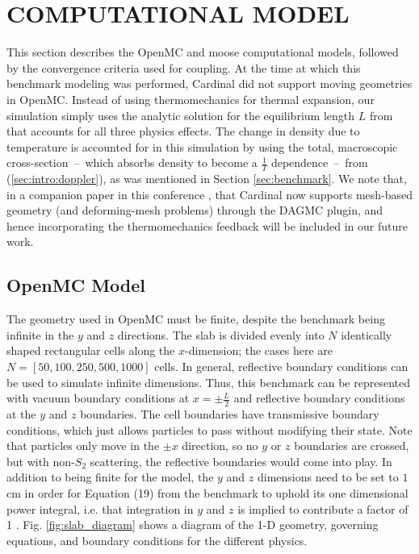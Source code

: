 \documentclass[letterpaper]{mc2023}
\begin{document}
\section{COMPUTATIONAL MODEL}
\label{sec:model}
This section describes the OpenMC and \gls{moose} computational models, followed by the convergence criteria used for coupling.
At the time at which this benchmark modeling was performed, Cardinal did not support moving geometries in OpenMC. Instead of
using thermomechanics for thermal expansion, our simulation simply uses the analytic solution for the equilibrium length $L$
from \cite{analytical-benchmark} that accounts for all three physics effects. The change in density due to temperature is
accounted for in this simulation by using the total, macroscopic cross-section\ --\ which absorbs density to become a
$\frac{1}{T}$ dependence\ --\ from (\ref{sec:intro:doppler}), as was mentioned in Section \ref{sec:benchmark}. We note that,
in a companion paper in this conference \cite{novak-2023}, that Cardinal now supports mesh-based geometry (and deforming-mesh
problems) through the DAGMC plugin, and hence incorporating the thermomechanics feedback will be included in our future work.


\subsection{OpenMC Model}
\label{sec:model:OpenMC}
The geometry used in OpenMC must be finite, despite the benchmark being infinite in the $y$ and $z$ directions. The slab
is divided evenly into $N$ identically shaped rectangular cells along the $x$-dimension; the cases here are $N=[50,100,250,500,1000]$
cells. In general, reflective boundary conditions can be used to simulate infinite dimensions. Thus, this benchmark can be
represented with vacuum boundary conditions at $x=\pm \frac{L}{2}$ and reflective boundary conditions at the $y$ and $z$ boundaries.
The cell boundaries have transmissive boundary conditions, which just allows particles to pass without modifying their state.
Note that particles only move in the $\pm x$ direction, so no $y$ or $z$ boundaries are crossed, but with non-$S_{2}$ scattering,
the reflective boundaries would come into play. In addition to being finite for the model, the $y$ and $z$ dimensions need to be
set to $1$ cm in order for Equation (19) from the benchmark to uphold its one dimensional power integral, i.e. that integration in
$y$ and $z$ is implied to contribute a factor of 1 \cite{analytical-benchmark}. Fig. \ref{fig:slab_diagram} shows a diagram
of the 1-D geometry, governing equations, and boundary conditions for the different physics.
\end{document}
